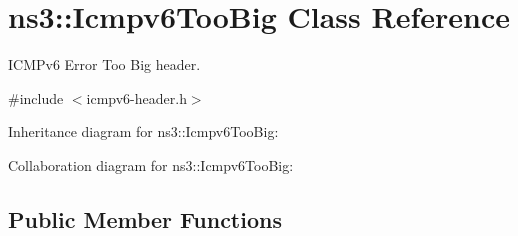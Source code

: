 \hypertarget{classns3_1_1Icmpv6TooBig}{}\section{ns3\+:\+:Icmpv6\+Too\+Big Class Reference}
\label{classns3_1_1Icmpv6TooBig}


I\+C\+M\+Pv6 Error Too Big header.  




{\ttfamily \#include $<$icmpv6-\/header.\+h$>$}



Inheritance diagram for ns3\+:\+:Icmpv6\+Too\+Big\+:


Collaboration diagram for ns3\+:\+:Icmpv6\+Too\+Big\+:
\subsection*{Public Member Functions}
